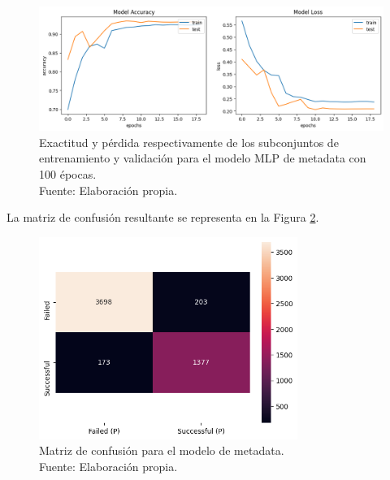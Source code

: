 \begin{figure}[!ht]
	\begin{center}
		\includegraphics[width=1\textwidth]{5/figures/metadata_model_acc_loss.png}
		\caption[Exactitud y pérdida respectivamente de los subconjuntos de entrenamiento y validación para el modelo MLP de metadata con 100 épocas]{Exactitud y pérdida respectivamente de los subconjuntos de entrenamiento y validación para el modelo MLP de metadata con 100 épocas.\\
		Fuente: Elaboración propia.}
		\label{5:fig1}
	\end{center}
\end{figure}

La matriz de confusión resultante se representa en la Figura \ref{5:fig2}.

\begin{figure}[!ht]
	\begin{center}
		\includegraphics[width=0.75\textwidth]{5/figures/metadata_confusion_matrix.png}
		\caption[Matriz de confusión para el modelo de metadata]{Matriz de confusión para el modelo de metadata.\\
		Fuente: Elaboración propia.}
		\label{5:fig2}
	\end{center}
\end{figure}

